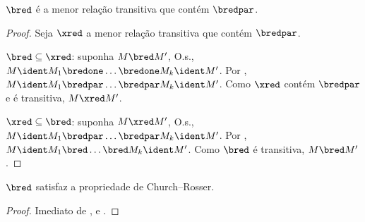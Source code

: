 \documentclass[../../../include/open-logic-section]{subfiles}
\begin{document}
\begin{lem}
  $\bred$ é a menor relação transitiva que contém $\bredpar$.
\end{lem}

\begin{proof}
  Seja $\xred$ a menor relação transitiva que contém $\bredpar$.

  $\bred \subseteq \xred$: suponha $M \bred M'$, O.s.\@, $M \ident M_1
  \bredone \dots \bredone M_k \ident M'$. Por , $M
  \ident M_1 \bredpar \dots \bredpar M_k \ident M'$. Como $\xred$
  contém $\bredpar$ e é transitiva, $M \xred M'$.

  $\xred \subseteq \bred$: suponha $M \xred M'$, O.s.\@, $M
  \ident M_1 \bredpar \dots \bredpar M_k \ident M'$. Por
  , $M \ident M_1 \bred \dots \bred M_k \ident M'$.
  Como $\bred$ é transitiva, $M \bred M'$.
\end{proof}

\begin{thm}
  $\bred$ satisfaz a propriedade de Church--Rosser.
\end{thm}

\begin{proof}
  Imediato de ,  e .
\end{proof}
\end{document}
